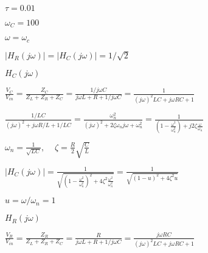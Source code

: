 \documentclass{article}
\def\lthtmlcheckvsize{\ifdim\ht\sizebox<\vsize 
  \ifdim\wd\sizebox<\hsize\expandafter\hfill\fi \expandafter\vfill
  \else\expandafter\vss\fi}%
\begin{document}
{\newpage\clearpage
{}%
$ \tau=0.01$%
\lthtmlindisplaymathZ
\lthtmlcheckvsize\clearpage}

{\newpage\clearpage
{}%
$ \omega_C=100$%
\lthtmlindisplaymathZ
\lthtmlcheckvsize\clearpage}

{\newpage\clearpage
{}%
$ \omega=\omega_c$%
\lthtmlindisplaymathZ
\lthtmlcheckvsize\clearpage}

{\newpage\clearpage
{}%
$ |H_R(j\omega)|=|H_C(j\omega)|=1/\sqrt{2}$%
\lthtmlindisplaymathZ
\lthtmlcheckvsize\clearpage}

{\newpage\clearpage
{}%
$\displaystyle H_C(j\omega)$%
\lthtmlindisplaymathZ
\lthtmlcheckvsize\clearpage}

{\newpage\clearpage
{}%
$\displaystyle \frac{V_C}{V_{in}}=\frac{Z_C}{Z_L+Z_R+Z_C}
=\frac{1/j\omega C}{j\omega L+R+1/j\omega C}
=\frac{1}{(j\omega)^2 LC+j\omega RC+1}$%
\lthtmlindisplaymathZ
\lthtmlcheckvsize\clearpage}

{\newpage\clearpage
{}%
$\displaystyle \frac{1/LC}{(j\omega)^2 +j\omega R/L+1/LC}
=\frac{\omega_n^2}{(j\omega)^2 +2\zeta\omega_n j\omega+\omega^2_n}
=\frac{1}{(1-\frac{\omega^2}{\omega_n^2})+j2\zeta\frac{\omega}{\omega_n}}$%
\lthtmlindisplaymathZ
\lthtmlcheckvsize\clearpage}

{\newpage\clearpage
{}%
$\displaystyle \omega_n=\frac{1}{\sqrt{LC}},\;\;\;\;\zeta=\frac{R}{2}\sqrt{\frac{C}{L}}$%
\lthtmlindisplaymathZ
\lthtmlcheckvsize\clearpage}

{\newpage\clearpage
{}%
$\displaystyle |H_C(j\omega)|
=\frac{1}{\sqrt{(1-\frac{\omega^2}{\omega_n^2})^2+4\zeta^2 \frac{\omega^2}{\omega_n^2}}}
=\frac{1}{\sqrt{(1-u)^2+4\zeta^2 u}}$%
\lthtmlindisplaymathZ
\lthtmlcheckvsize\clearpage}

{\newpage\clearpage
{}%
$ u=\omega/\omega_n=1$%
\lthtmlindisplaymathZ
\lthtmlcheckvsize\clearpage}

{\newpage\clearpage
{}%
$\displaystyle H_R(j\omega)$%
\lthtmlindisplaymathZ
\lthtmlcheckvsize\clearpage}

{\newpage\clearpage
{}%
$\displaystyle \frac{V_R}{V_{in}}=\frac{Z_R}{Z_L+Z_R+Z_C}
=\frac{R}{j\omega L+R+1/j\omega C}
=\frac{j\omega RC}{(j\omega)^2 LC+j\omega RC+1}$%
\lthtmlindisplaymathZ
\lthtmlcheckvsize\clearpage}
\end{document}
